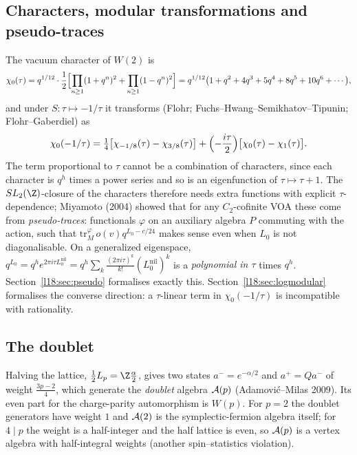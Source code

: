 \subsection{Characters, modular transformations and pseudo-traces}
The vacuum character of $W(2)$ is
\begin{equation}\label{l18:eq:char}
\chi_0(\tau)=q^{1/12}\cdot\frac12\Bigl[\prod_{n\ge1}(1+q^n)^2+\prod_{n\ge1}(1-q^n)^2\Bigr]
=q^{1/12}\bigl(1+q^2+4q^3+5q^4+8q^5+10q^6+\cdots\bigr),
\end{equation}
and under $S:\tau\mapsto-1/\tau$ it transforms (Flohr; Fuchs--Hwang--Semikhatov--Tipunin;
Flohr--Gaberdiel) as
\begin{equation}\label{l18:eq:Schi}
\chi_0(-1/\tau)=\tfrac14\bigl[\chi_{-1/8}(\tau)-\chi_{3/8}(\tau)\bigr]
+\Bigl(-\frac{i\tau}{2}\Bigr)\bigl[\chi_0(\tau)-\chi_1(\tau)\bigr].
\end{equation}
The term proportional to $\tau$ cannot be a combination of characters, since each character is
$q^h$ times a power series and so is an eigenfunction of $\tau\mapsto\tau+1$. The $SL_2(\Z)$-closure
of the characters therefore needs extra functions with explicit $\tau$-dependence; Miyamoto (2004)
showed that for any $C_2$-cofinite VOA these come from \emph{pseudo-traces}: functionals
$\varphi$ on an auxiliary algebra $P$ commuting with the action, such that
$\mathrm{tr}^{\varphi}_M\,o(v)q^{L_0-c/24}$ makes sense even when $L_0$ is not diagonalisable. On a
generalized eigenspace, $q^{L_0}=q^h e^{2\pi i\tau L_0^{\mathrm{nil}}}=q^h\sum_k\frac{(2\pi i\tau)^k}{k!}
(L_0^{\mathrm{nil}})^k$ is a \emph{polynomial in $\tau$} times $q^h$. Section~\ref{l18:sec:pseudo}
formalises exactly this. Section~\ref{l18:sec:logmodular} formalises the converse direction: a
$\tau$-linear term in $\chi_0(-1/\tau)$ is incompatible with rationality.

\subsection{The doublet}
Halving the lattice, $\frac12L_p=\Z\frac\alpha2$, gives two states $a^-=e^{-\alpha/2}$ and
$a^+=Qa^-$ of weight $\frac{3p-2}{4}$, which generate the \emph{doublet} algebra $\mathcal{A}(p)$
(Adamovi\'c--Milas 2009). Its even part for the charge-parity automorphism is $W(p)$. For $p=2$
the doublet generators have weight $1$ and $\mathcal{A}(2)$ is the symplectic-fermion algebra itself;
for $4\mid p$ the weight is a half-integer and the half lattice is even, so $\mathcal{A}(p)$ is a
vertex algebra with half-integral weights (another spin--statistics violation).


